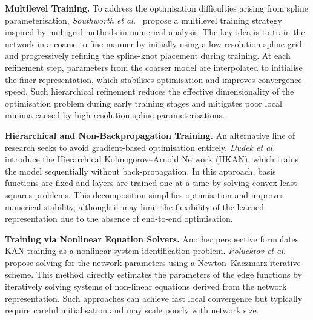 \documentclass{article}
\begin{document}
\textbf{Multilevel Training.}
To address the optimisation difficulties arising from spline parameterisation, \textit{Southworth et al.}~\cite{southworth2026multilevel} propose a multilevel training strategy inspired by multigrid methods in numerical analysis.
The key idea is to train the network in a coarse-to-fine manner by initially using a low-resolution spline grid and progressively refining the spline-knot placement during training.
At each refinement step, parameters from the coarser model are interpolated to initialise the finer representation, which stabilises optimisation and improves convergence speed.
Such hierarchical refinement reduces the effective dimensionality of the optimisation problem during early training stages and mitigates poor local minima caused by high-resolution spline parameterisations.


\textbf{Hierarchical and Non-Backpropagation Training.}
An alternative line of research seeks to avoid gradient-based optimisation entirely.
\textit{Dudek et al.}~\cite{dudek2025hkan} introduce the Hierarchical Kolmogorov–Arnold Network (HKAN), which trains the model sequentially without back-propagation.
In this approach, basis functions are fixed and layers are trained one at a time by solving convex least-squares problems.
This decomposition simplifies optimisation and improves numerical stability, although it may limit the flexibility of the learned representation due to the absence of end-to-end optimisation.


\textbf{Training via Nonlinear Equation Solvers.}
Another perspective formulates KAN training as a nonlinear system identification problem.
\textit{Poluektov et al.}~\cite{poluektov2025construction} propose solving for the network parameters using a Newton–Kaczmarz iterative scheme.
This method directly estimates the parameters of the edge functions by iteratively solving systems of non-linear equations derived from the network representation.
Such approaches can achieve fast local convergence but typically require careful initialisation and may scale poorly with network size.
\end{document}
